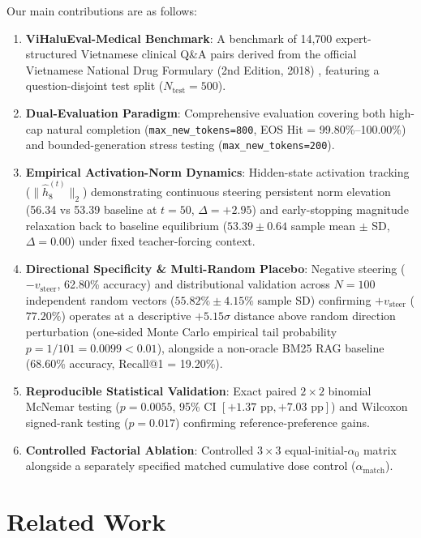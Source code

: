 \documentclass[conference]{IEEEtran}
\begin{document}
Our main contributions are as follows:
\begin{enumerate}
    \item \textbf{ViHaluEval-Medical Benchmark}: A benchmark of 14,700 expert-structured Vietnamese clinical Q\&A pairs derived from the official Vietnamese National Drug Formulary (2nd Edition, 2018) \cite{ref6}, featuring a question-disjoint test split ($N_{\text{test}}=500$).
    \item \textbf{Dual-Evaluation Paradigm}: Comprehensive evaluation covering both high-cap natural completion (\texttt{max\_new\_tokens=800}, EOS Hit = 99.80\%--100.00\%) and bounded-generation stress testing (\texttt{max\_new\_tokens=200}).
    \item \textbf{Empirical Activation-Norm Dynamics}: Hidden-state activation tracking ($\|\hat{h}_8^{(t)}\|_2$) demonstrating continuous steering persistent norm elevation (56.34 vs 53.39 baseline at $t=50$, $\Delta = +2.95$) and early-stopping magnitude relaxation back to baseline equilibrium ($53.39 \pm 0.64$ sample mean $\pm$ SD, $\Delta = 0.00$) under fixed teacher-forcing context.
    \item \textbf{Directional Specificity \& Multi-Random Placebo}: Negative steering ($-v_{\text{steer}}$, 62.80\% accuracy) and distributional validation across $N=100$ independent random vectors ($55.82\% \pm 4.15\%$ sample SD) confirming $+v_{\text{steer}}$ ($77.20\%$) operates at a descriptive $+5.15\sigma$ distance above random direction perturbation (one-sided Monte Carlo empirical tail probability $p=1/101=0.0099 < 0.01$), alongside a non-oracle BM25 RAG baseline (68.60\% accuracy, Recall@1 = 19.20\%).
    \item \textbf{Reproducible Statistical Validation}: Exact paired $2\times 2$ binomial McNemar testing ($p=0.0055$, 95\% CI $[+1.37\text{ pp}, +7.03\text{ pp}]$) and Wilcoxon signed-rank testing ($p=0.017$) confirming reference-preference gains.
    \item \textbf{Controlled Factorial Ablation}: Controlled $3\times 3$ equal-initial-$\alpha_0$ matrix alongside a separately specified matched cumulative dose control ($\alpha_{\text{match}}$).
\end{enumerate}

\section{Related Work}
\end{document}
